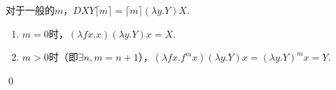 \begin{pf} \rm \;
    对于一般的$m$，$DXY\lceil m\rceil =\lceil m\rceil (\lambda y.Y) X $.
    \begin{enumerate}
        \item $m=0$时，$(\lambda f x.x) (\lambda y.Y) x = X$.
        \item $m>0$时（即$\exists n, m=n+1$），$(\lambda fx.f^{m} x)(\lambda y.Y) x = (\lambda y.Y)^m x = Y$. 
    \end{enumerate}

    \qed 
\end{pf}